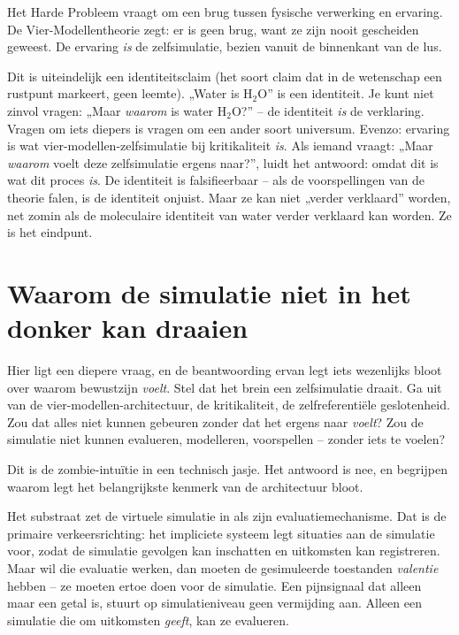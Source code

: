 \documentclass[11pt, twoside, openright]{book}
\begin{document}
Het Harde Probleem vraagt om een brug tussen fysische verwerking en ervaring. De Vier-Modellentheorie zegt: er is geen brug, want ze zijn nooit gescheiden geweest. De ervaring \textit{is} de zelfsimulatie, bezien vanuit de binnenkant van de lus.

Dit is uiteindelijk een identiteitsclaim (het soort claim dat in de wetenschap een rustpunt markeert, geen leemte). „Water is H$_2$O” is een identiteit. Je kunt niet zinvol vragen: „Maar \textit{waarom} is water H$_2$O?” -- de identiteit \textit{is} de verklaring. Vragen om iets diepers is vragen om een ander soort universum. Evenzo: ervaring is wat vier-modellen-zelfsimulatie bij kritikaliteit \textit{is}. Als iemand vraagt: „Maar \textit{waarom} voelt deze zelfsimulatie ergens naar?”, luidt het antwoord: omdat dit is wat dit proces \textit{is}. De identiteit is falsifieerbaar -- als de voorspellingen van de theorie falen, is de identiteit onjuist. Maar ze kan niet „verder verklaard” worden, net zomin als de moleculaire identiteit van water verder verklaard kan worden. Ze is het eindpunt.

\section*{Waarom de simulatie niet in het donker kan draaien}

Hier ligt een diepere vraag, en de beantwoording ervan legt iets wezenlijks bloot over waarom bewustzijn \textit{voelt}. Stel dat het brein een zelfsimulatie draait. Ga uit van de vier-modellen-architectuur, de kritikaliteit, de zelfreferentiële geslotenheid. Zou dat alles niet kunnen gebeuren zonder dat het ergens naar \textit{voelt}? Zou de simulatie niet kunnen evalueren, modelleren, voorspellen -- zonder iets te voelen?

Dit is de zombie-intuïtie in een technisch jasje. Het antwoord is nee, en begrijpen waarom legt het belangrijkste kenmerk van de architectuur bloot.

Het substraat zet de virtuele simulatie in als zijn evaluatiemechanisme. Dat is de primaire verkeersrichting: het impliciete systeem legt situaties aan de simulatie voor, zodat de simulatie gevolgen kan inschatten en uitkomsten kan registreren. Maar wil die evaluatie werken, dan moeten de gesimuleerde toestanden \textit{valentie} hebben -- ze moeten ertoe doen voor de simulatie. Een pijnsignaal dat alleen maar een getal is, stuurt op simulatieniveau geen vermijding aan. Alleen een simulatie die om uitkomsten \textit{geeft}, kan ze evalueren.
\end{document}
